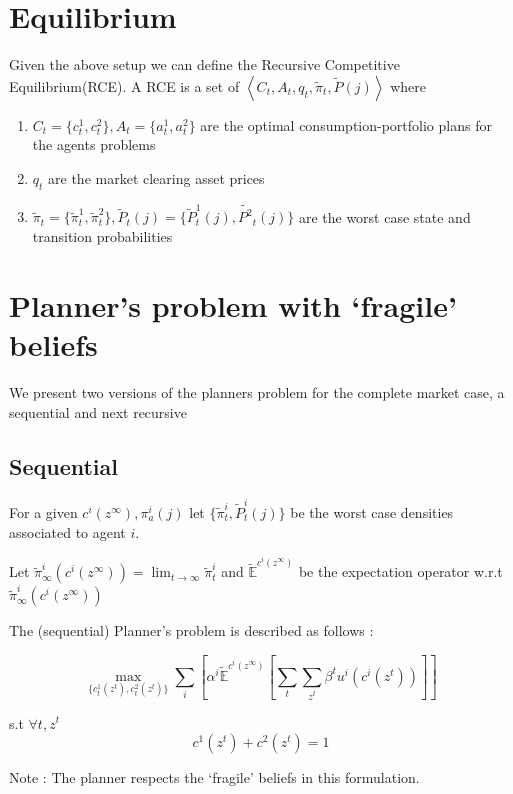 \documentclass[a4paper,12pt]{article}
\begin{document}
\section{Equilibrium}
\noindent Given the above setup we can define the Recursive Competitive Equilibrium(RCE). 
\noindent A RCE is a set of $\left\langle C_t , A_t , q_t , \tilde{\pi}_t, \tilde{P}(j) \right\rangle$ where 
\begin{enumerate}
	\item $C_t=\{c^1_t,c^2_t\},A_t=\{a^1_t,a^2_t\}$ are the optimal consumption-portfolio plans for the agents problems
	\item $q_t$ are the market clearing asset prices
	\item  $\tilde{\pi}_t = \{\tilde{\pi}^1_t, \tilde{\pi}^2_t\}, \tilde{P}_t(j)=\{ \tilde{P}_t^1(j), \tilde{P^2}_t(j)\}$ are the worst case state and transition probabilities
\end{enumerate}

\section{Planner's problem with `fragile' beliefs}
We present two versions of the planners problem for the complete market case, a sequential and next recursive
\subsection{Sequential}
\noindent For a given $c^i(z^{\infty}), \pi^i_a(j)$ let $\{\tilde{\pi}^i_t, \tilde{P}_t^i(j)\}$ be the worst case densities associated to agent $i$. 

\noindent Let $\tilde{\pi}^i_{\infty}(c^i(z^{\infty}))=\lim_{t\to\infty}\tilde{\pi}^i_t$ and $\tilde{\mathbb{E}}^{c^i(z^{\infty})}$ be the expectation operator w.r.t $\tilde{\pi}^i_{\infty}(c^i(z^{\infty}))$


\noindent The (sequential) Planner's problem is described as follows :

\[\max_{\{c^1_t(z^t),c^2_t(z^t)\}} \sum_i\left[\alpha^i \tilde{\mathbb{E}}^{c^i(z^{\infty})}\left[\sum_t\sum_{z^t}\beta^tu^i(c^i(z^t))\right]\right ]\]

s.t $\forall t, z^t$
\[c^1(z^t)+c^2(z^t)=1\]


\noindent Note : The planner respects the `fragile' beliefs  in this formulation.
\end{document}
